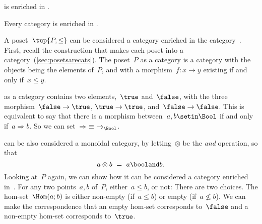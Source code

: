 {    \begin{example}
        \Category is enriched in \Category.
    \end{example}

    \begin{example}
        Every category is enriched in \Set.
    \end{example}

    \begin{example}
        A poset~$\tup{P, \leq}$ can be considered a category enriched in the category~\Bool.
        First, recall the construction that makes each poset into a category~(\cref{sec:posetsarecats}).
        The poset~$P$ as a category is a category with the objects being the elements of~$P$, and with a morphism~$f\colon x \to y$ existing if and only if~$x\leq y$.

        \Bool as a category contains two elements,~$\true$ and~$\false$, with the three morphism~$\false \to \true$, $\true \to \true$, and~$\false \to \false$.
        This is equivalent to say that there is a morphism between~$a, b \setin \Bool$ if and only if~$a \Rightarrow b$.
        So we can set~$\Rightarrow\ \equiv\ \to_{\Bool}$.

        \Bool can be also considered a monoidal category, by letting~$\otimes$ be the \emph{and} operation, so that
        \begin{equation}
            a \otimes b\ =\ a \booland b.
        \end{equation}
        Looking at~$P$ again, we can show how it can be considered a category enriched in~\Bool.
        For any two points~$a, b$ of~$P$, either~$a \leq b$, or not: There are two choices.
        The hom-set~$\Hom(a; b)$ is either non-empty (if~$a \leq b$) or empty (if~$a \not\leq b$).
        We can make the correspondence that an empty hom-set corresponds to~$\false$ and a non-empty hom-set corresponds to~$\true$.


\end{example}}
